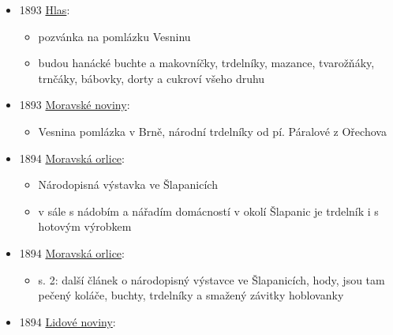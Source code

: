 \begin{itemize}
  \begin{itemize}
  \tightlist
  \item
    s. 2: sokolská slavnost v Ivančicích, ivančická vzdělávací jednota
    Vesna přispěla jídlem, třeba pravými slovanskými trdelníky
  \end{itemize}
\item
  1893
  \href{https://www.digitalniknihovna.cz/vkol/uuid/uuid:5c67ba20-c4a9-4c5c-ae99-6e429ed8cd1d}{Hlas}:

  \begin{itemize}
  \tightlist
  \item
    pozvánka na pomlázku Vesninu
  \item
    budou hanácké buchte a makovníčky, trdelníky, mazance, tvarožňáky,
    trnčáky, bábovky, dorty a cukroví všeho druhu
  \end{itemize}
\item
  1893
  \href{https://www.digitalniknihovna.cz/vkol/uuid/uuid:7584cb6d-4978-4820-9af6-7d206917db08}{Moravské
  noviny}:

  \begin{itemize}
  \tightlist
  \item
    Vesnina pomlázka v Brně, národní trdelníky od pí. Páralové z
    Ořechova
  \end{itemize}
\item
  1894
  \href{https://ndk.cz/view/uuid:04ec7ad2-32f0-11de-992b-00145e5790ea?page=uuid\%3A81b0ec10-3115-11e8-b257-005056825209&fulltext=trdeln\%C3\%ADk}{Moravská
  orlice}:

  \begin{itemize}
  \tightlist
  \item
    Národopisná výstavka ve Šlapanicích
  \item
    v sále s nádobím a nářadím domácností v okolí Šlapanic je trdelník i
    s hotovým výrobkem
  \end{itemize}
\item
  1894
  \href{https://ceskadigitalniknihovna.cz/uuid/uuid:2a2ac745-32f0-11de-992b-00145e5790ea}{Moravská
  orlice}:

  \begin{itemize}
  \tightlist
  \item
    s. 2: další článek o národopisný výstavce ve Šlapanicích, hody, jsou
    tam pečený koláče, buchty, trdelníky a smažený závitky hoblovanky
  \end{itemize}
\item
  1894
  \href{https://ceskadigitalniknihovna.cz/uuid/uuid:b8222e44-435d-11dd-b505-00145e5790ea}{Lidové
  noviny}:


\end{itemize}
